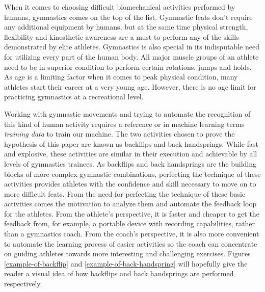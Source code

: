 When it comes to choosing difficult biomechanical activities performed by humans, gymnastics comes on the top of the list. Gymnastic feats don't require any additional equipment by humans, but at the same time physical strength, flexibility and kinesthetic awareness are a must to perform any of the skills demonstrated by elite athletes. Gymnastics is also special in its indisputable need for utilizing every part of the human body. All major muscle groups of an athlete need to be in superior condition to perform certain rotations, jumps and holds. As age is a limiting factor when it comes to peak physical condition, many athletes start their career at a very young age. However, there is no age limit for practicing gymnastics at a recreational level.

Working with gymnastic movements and trying to automate the recognition of this kind of human activity requires a reference or in machine learning terms \textit{training data} to train our machine. The two activities chosen to prove the hypothesis of this paper are known as backflips and back handsprings. While fast and explosive, these activities are similar in their execution and achievable by all levels of gymnastics trainees. As backflips and back handsprings are the building blocks of more complex gymnastic combinations, perfecting the technique of these activities provides athletes with the confidence and skill necessary to move on to more difficult feats. From the need for perfecting the technique of these basic activities comes the motivation to analyze them and automate the feedback loop for the athletes. From the athlete's perspective, it is faster and cheaper to get the feedback from, for example, a portable device with recording capabilities, rather than a gymnastics coach. From the coach's perspective, it is also more convenient to automate the learning process of easier activities so the coach can concentrate on guiding athletes towards more interesting and challenging exercises. Figures \ref{example-of-backflip} and \ref{example-of-back-handspring} will hopefully give the reader a visual idea of how backflips and back handsprings are performed respectively. 

